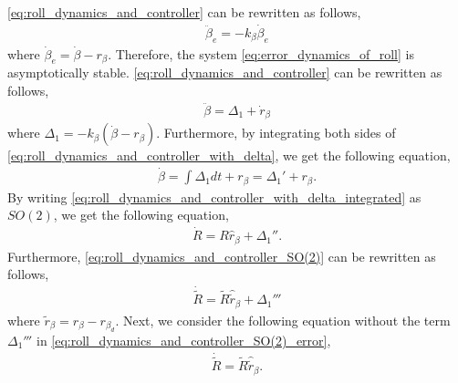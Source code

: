 \eqref{eq:roll_dynamics_and_controller} can be rewritten as follows,
\begin{align}
    \label{eq:error_dynamics_of_roll}
    \ddot{\beta}_e = -k_{\beta} \dot{\beta}_e
\end{align}
where $ \dot{\beta}_e = \dot{\beta} - r_{\beta} $.
Therefore, the system \eqref{eq:error_dynamics_of_roll} is asymptotically stable.
\eqref{eq:roll_dynamics_and_controller} can be rewritten as follows,
\begin{align}
    \label{eq:roll_dynamics_and_controller_with_delta}
    \ddot{\beta} = \Delta_1 + \dot{r}_{\beta}
\end{align}
where $ \Delta_1 = -k_{\beta} (\dot{\beta} - r_{\beta}) $.
Furthermore, by integrating both sides of \eqref{eq:roll_dynamics_and_controller_with_delta}, we get the following equation,
\begin{align}
\label{eq:roll_dynamics_and_controller_with_delta_integrated}
    \dot{\beta} = \int \Delta_1 dt + r_{\beta} = \Delta_1' + r_{\beta}.
\end{align}
By writing \eqref{eq:roll_dynamics_and_controller_with_delta_integrated} as $ SO(2) $, we get the following equation,
\begin{align}
    \label{eq:roll_dynamics_and_controller_SO(2)}
    \dot{R} = R \hat{r}_{\beta} + \Delta_1''.
\end{align}
Furthermore, \eqref{eq:roll_dynamics_and_controller_SO(2)} can be rewritten as follows,
\begin{align}
    \label{eq:roll_dynamics_and_controller_SO(2)_error}
    \dot{\tilde{R}} = \tilde{R} \hat{\tilde{r}}_{\beta} + \Delta_1'''
\end{align}
where $ \tilde{r}_{\beta} = r_{\beta} - r_{\beta_d} $.
Next, we consider the following equation without the term $ \Delta_1''' $ in \eqref{eq:roll_dynamics_and_controller_SO(2)_error},
\begin{align}
    \label{eq:roll_dynamics_and_controller_SO(2)_error_without_delta}
    \dot{\tilde{R}} = \tilde{R} \hat{\tilde{r}}_{\beta}.
\end{align}
